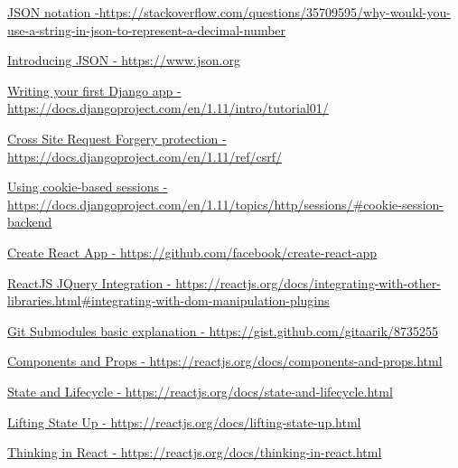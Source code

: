 \begin{thebibliography}{9}
    \href{https://stackoverflow.com/questions/35709595/why-would-you-use-a-string-in-json-to-represent-a-decimal-number}{JSON notation -https://stackoverflow.com/questions/35709595/why-would-you-use-a-string-in-json-to-represent-a-decimal-number}

    \href{https://www.json.org}{Introducing JSON - https://www.json.org}

    \href{https://docs.djangoproject.com/en/1.11/intro/tutorial01/}{Writing your first Django app - https://docs.djangoproject.com/en/1.11/intro/tutorial01/}

    \href{https://docs.djangoproject.com/en/1.11/ref/csrf/}{Cross Site Request Forgery protection - https://docs.djangoproject.com/en/1.11/ref/csrf/}

    \href{https://docs.djangoproject.com/en/1.11/topics/http/sessions/#cookie-session-backend}{Using cookie-based sessions - https://docs.djangoproject.com/en/1.11/topics/http/sessions/\#cookie-session-backend}

    \href{https://github.com/facebook/create-react-app}{Create React App - https://github.com/facebook/create-react-app}

    \href{https://reactjs.org/docs/integrating-with-other-libraries.html#integrating-with-dom-manipulation-plugins}{ReactJS JQuery Integration - https://reactjs.org/docs/integrating-with-other-libraries.html\#integrating-with-dom-manipulation-plugins}

    \href{https://gist.github.com/gitaarik/8735255}{Git Submodules basic explanation - https://gist.github.com/gitaarik/8735255}

    \href{https://reactjs.org/docs/components-and-props.html}{Components and Props - https://reactjs.org/docs/components-and-props.html}

    \href{https://reactjs.org/docs/state-and-lifecycle.html}{State and Lifecycle - https://reactjs.org/docs/state-and-lifecycle.html}

    \href{https://reactjs.org/docs/lifting-state-up.html}{Lifting State Up - https://reactjs.org/docs/lifting-state-up.html}
    
    \href{https://reactjs.org/docs/thinking-in-react.html}{Thinking in React - https://reactjs.org/docs/thinking-in-react.html}
    

\end{thebibliography}
